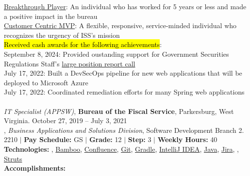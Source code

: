 \documentclass[10pt]{res} %
\begin{document}
\begin{resume}
\hspace*{3.925em} \href{https://bjdelacruz.dev/files/2022_ISSPY_Certificate_Breakthrough_Player_Award.pdf}{\color{blue}Breakthrough Player}: An individual who has worked for 5 years or less and made a positive impact in the bureau \\
\hspace*{3.925em} \href{https://bjdelacruz.dev/files/2022_ISSPY_Certificate_Customer_Centric_MVP_Award_Individual.pdf}{\color{blue}Customer Centric MVP}: A flexible, responsive, service-minded individual who recognizes the urgency of ISS's mission \\
\hspace*{3em}\faAward\space \hl{Received cash awards for the following achievements}: \\
\hspace*{3.925em} September 8, 2024: Provided oustanding support for Government Securities Regulations Staff's \href{https://www.treasurydirect.gov/laws-and-regulations/gsa/lpr-reports}{\color{blue}large position report call} \\
\hspace*{3.925em} July 17, 2022: Built a DevSecOps pipeline for new web applications that will be deployed to Microsoft Azure \\
\hspace*{3.925em} July 17, 2022: Coordinated remediation efforts for many Spring web applications \\ \\
{\sl IT Specialist (APPSW)}, {\bf Bureau of the Fiscal Service}, Parkersburg, West Virginia. \hfill October 27, 2019 -- July 3, 2021 \\
\hspace*{1em}{\bf Information and Security Services (ISS)}, {\sl Business Applications and Solutions Division}, Software Development Branch 2. \\
\hspace*{1em}{\bf Series:} 2210 $|$ {\bf Pay Schedule:} GS $|$ {\bf Grade:} 12 $|$ {\bf Step:} 3 $|$ {\bf Weekly Hours:} 40 \\
\hspace*{2em} {\bf Technologies:} \underline{}, \underline{Bamboo}, \underline{Confluence}, \underline{Git}, \underline{Gradle}, \underline{IntelliJ IDEA}, \underline{Java}, \underline{Jira}, \underline{}, \underline{Struts} \\
\hspace*{2em} {\bf Accomplishments:} \\

\end{resume}
\end{document}

